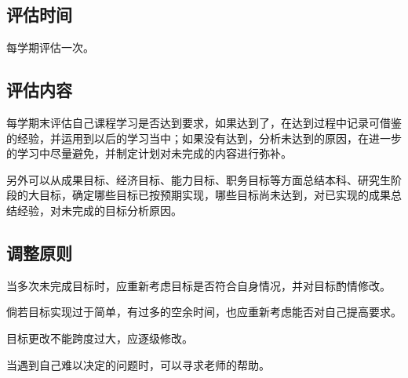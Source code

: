 \documentclass{article}
\begin{document}
\subsection{评估时间}
每学期评估一次。\par
\subsection{评估内容}
每学期末评估自己课程学习是否达到要求，如果达到了，在达到过程中记录可借鉴的经验，并运用到以后的学习当中；如果没有达到，分析未达到的原因，在进一步的学习中尽量避免，并制定计划对未完成的内容进行弥补。\par
另外可以从成果目标、经济目标、能力目标、职务目标等方面总结本科、研究生阶段的大目标，确定哪些目标已按预期实现，哪些目标尚未达到，对已实现的成果总结经验，对未完成的目标分析原因。\par
\subsection{调整原则}
当多次未完成目标时，应重新考虑目标是否符合自身情况，并对目标酌情修改。\par
倘若目标实现过于简单，有过多的空余时间，也应重新考虑能否对自己提高要求。\par
目标更改不能跨度过大，应逐级修改。\par
当遇到自己难以决定的问题时，可以寻求老师的帮助。\par
\end{document}

